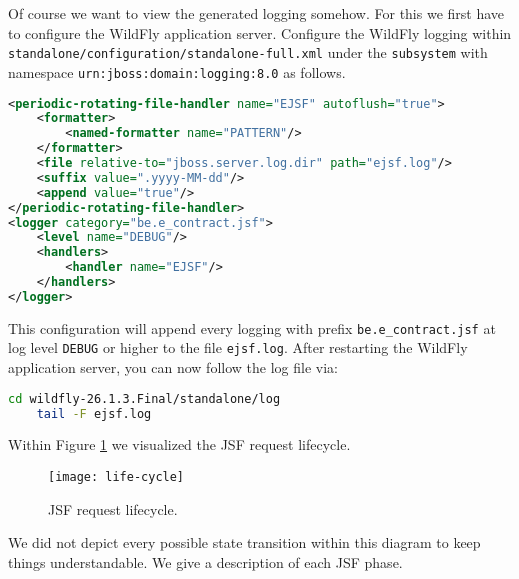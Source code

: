 Of course we want to view the generated logging somehow.
For this we first have to configure the WildFly application server.
Configure the WildFly logging within \texttt{standalone/configuration/standalone-full.xml} under the \texttt{subsystem} with namespace \texttt{urn:jboss:domain:logging:8.0} as follows.
\begin{lstlisting}[language=XML]
<periodic-rotating-file-handler name="EJSF" autoflush="true">
	<formatter>
		<named-formatter name="PATTERN"/>
	</formatter>
	<file relative-to="jboss.server.log.dir" path="ejsf.log"/>
	<suffix value=".yyyy-MM-dd"/>
	<append value="true"/>
</periodic-rotating-file-handler>
<logger category="be.e_contract.jsf">
	<level name="DEBUG"/>
	<handlers>
		<handler name="EJSF"/>
	</handlers>
</logger>
\end{lstlisting}
This configuration will append every logging with prefix \texttt{be.e\_contract.jsf} at log level \texttt{DEBUG} or higher to the file \texttt{ejsf.log}.
After restarting the WildFly application server, you can now follow the log file via:
\begin{lstlisting}[language=bash]
	cd wildfly-26.1.3.Final/standalone/log
	tail -F ejsf.log
\end{lstlisting}
Within Figure \ref{fig:life-cycle} we visualized the JSF request lifecycle.
\begin{figure}[htbp]
	\begin{center}
		\texttt{[image: life-cycle]}
		\caption{JSF request lifecycle.}
		\label{fig:life-cycle}
	\end{center}
\end{figure}
We did not depict every possible state transition within this diagram to keep things understandable.
We give a description of each JSF phase.
